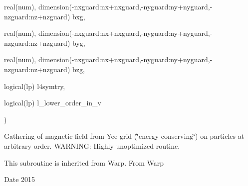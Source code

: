 {\begin{DoxyParamCaption}
\item[{real(num), dimension(-\/nxguard\+:nx+nxguard,-\/nyguard\+:ny+nyguard,-\/nzguard\+:nz+nzguard)}]{bxg, }
\item[{real(num), dimension(-\/nxguard\+:nx+nxguard,-\/nyguard\+:ny+nyguard,-\/nzguard\+:nz+nzguard)}]{byg, }
\item[{real(num), dimension(-\/nxguard\+:nx+nxguard,-\/nyguard\+:ny+nyguard,-\/nzguard\+:nz+nzguard)}]{bzg, }
\item[{logical(lp)}]{l4symtry, }
\item[{logical(lp)}]{l\+\_\+lower\+\_\+order\+\_\+in\+\_\+v}
\end{DoxyParamCaption}
)}\hypertarget{field__gathering_8_f90_a3d18b5a2fca069b67c4e49c7d1559dd8}{}\label{field__gathering_8_f90_a3d18b5a2fca069b67c4e49c7d1559dd8}


Gathering of magnetic field from Yee grid (\char`\"{}energy conserving\char`\"{}) on particles at arbitrary order. W\+A\+R\+N\+I\+NG\+: Highly unoptimized routine. 

This subroutine is inherited from Warp.  From Warp \begin{DoxyDate}{Date}
2015 
\end{DoxyDate}
